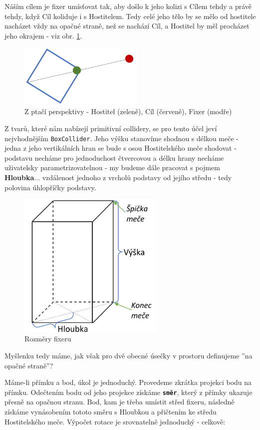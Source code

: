 Náším cílem je fixer umísťovat tak, aby došlo k jeho kolizi s Cílem tehdy a právě tehdy, když Cíl koliduje i s Hostitelem. Tedy celé jeho tělo by se mělo od hostitele nacházet vždy na opačné straně, než se nachází Cíl, a Hostitel by měl procházet jeho okrajem - viz obr. \ref{obr05:fixerBirdseye}. 
\begin{figure}[ht]\centering
  \center
  \includegraphics[height=30mm]{../img/fixerBirdseye.png}
  \caption{Z ptačí perspektivy - Hostitel (zeleně), Cíl (červeně), Fixer (modře)}
  \label{obr05:fixerBirdseye}
\end{figure} 
Z tvarů, které nám nabízejí primitivní collidery, se pro tento účel jeví nejvhodnějším \texttt{BoxCollider}. Jeho výšku stanovíme shodnou s délkou meče - jedna z jeho vertikálních hran se bude s osou Hostitelského meče shodovat - podstavu necháme pro jednoduchost čtvercovou a délku hrany necháme uživatelsky parametrizovatelnou - my budeme dále pracovat s pojmem \textbf{Hloubka}... vzdálenost jednoho z vrcholů podstavy od jejího středu - tedy polovina úhlopříčky podstavy.
\begin{figure}[ht]\centering
  \center
  \includegraphics[height=70mm]{../img/fixerDefinitions.png}
  \caption{Rozměry fixeru}
  \label{obr05:fixerDefinitions}
\end{figure} 

Myšlenku tedy máme, jak však pro dvě obecné úsečky v prostoru definujeme ''na opačné straně''?

\bigbreak

Máme-li přímku a bod, úkol je jednoduchý. Provedeme zkrátka projekci bodu na přímku. Odečtením bodu od jeho projekce získáme \textbf{\texttt{směr}}, který z přímky ukazuje přesně na opačnou stranu. Bod, kam je třeba umístit střed fixeru, následně získáme vynásobením tototo směru s Hloubkou a přičtením ke středu Hostitelského meče. Výpočet rotace je srovnatelně jednoduchý - celkově:   

